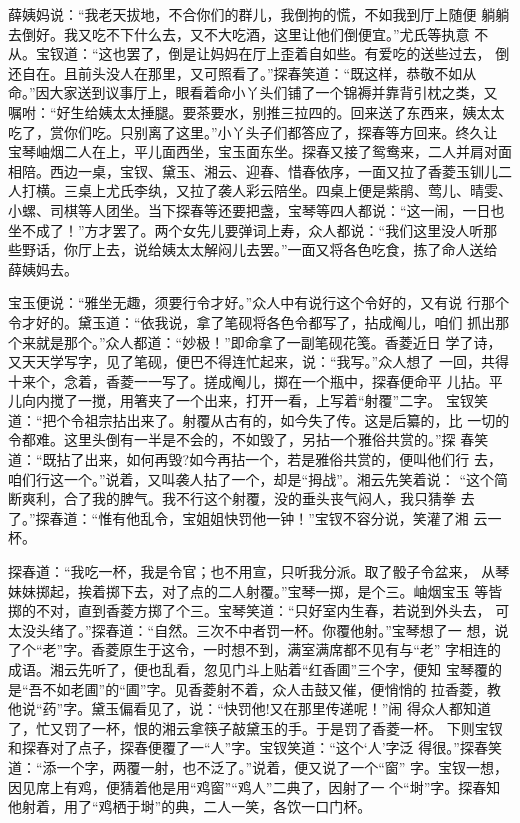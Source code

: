 薛姨妈说：“我老天拔地，不合你们的群儿，我倒拘的慌，不如我到厅上随便
躺躺去倒好。我又吃不下什么去，又不大吃酒，这里让他们倒便宜。”尤氏等执意
不从。宝钗道：“这也罢了，倒是让妈妈在厅上歪着自如些。有爱吃的送些过去，
倒还自在。且前头没人在那里，又可照看了。”探春笑道：“既这样，恭敬不如从
命。”因大家送到议事厅上，眼看着命小丫头们铺了一个锦褥并靠背引枕之类，又
嘱咐：“好生给姨太太捶腿。要茶要水，别推三拉四的。回来送了东西来，姨太太
吃了，赏你们吃。只别离了这里。”小丫头子们都答应了，探春等方回来。终久让
宝琴岫烟二人在上，平儿面西坐，宝玉面东坐。探春又接了鸳鸯来，二人并肩对面
相陪。西边一桌，宝钗、黛玉、湘云、迎春、惜春依序，一面又拉了香菱玉钏儿二
人打横。三桌上尤氏李纨，又拉了袭人彩云陪坐。四桌上便是紫鹃、莺儿、晴雯、
小螺、司棋等人团坐。当下探春等还要把盏，宝琴等四人都说：“这一闹，一日也
坐不成了！”方才罢了。两个女先儿要弹词上寿，众人都说：“我们这里没人听那
些野话，你厅上去，说给姨太太解闷儿去罢。”一面又将各色吃食，拣了命人送给
薛姨妈去。

宝玉便说：“雅坐无趣，须要行令才好。”众人中有说行这个令好的，又有说
行那个令才好的。黛玉道：“依我说，拿了笔砚将各色令都写了，拈成阄儿，咱们
抓出那个来就是那个。”众人都道：“妙极！”即命拿了一副笔砚花笺。香菱近日
学了诗，又天天学写字，见了笔砚，便巴不得连忙起来，说：“我写。”众人想了
一回，共得十来个，念着，香菱一一写了。搓成阄儿，掷在一个瓶中，探春便命平
儿拈。平儿向内搅了一搅，用箸夹了一个出来，打开一看，上写着“射覆”二字。
宝钗笑道：“把个令祖宗拈出来了。射覆从古有的，如今失了传。这是后纂的，比
一切的令都难。这里头倒有一半是不会的，不如毁了，另拈一个雅俗共赏的。”探
春笑道：“既拈了出来，如何再毁?如今再拈一个，若是雅俗共赏的，便叫他们行
去，咱们行这一个。”说着，又叫袭人拈了一个，却是“拇战”。湘云先笑着说：
“这个简断爽利，合了我的脾气。我不行这个射覆，没的垂头丧气闷人，我只猜拳
去了。”探春道：“惟有他乱令，宝姐姐快罚他一钟！”宝钗不容分说，笑灌了湘
云一杯。

探春道：“我吃一杯，我是令官；也不用宣，只听我分派。取了骰子令盆来，
从琴妹妹掷起，挨着掷下去，对了点的二人射覆。”宝琴一掷，是个三。岫烟宝玉
等皆掷的不对，直到香菱方掷了个三。宝琴笑道：“只好室内生春，若说到外头去，
可太没头绪了。”探春道：“自然。三次不中者罚一杯。你覆他射。”宝琴想了一
想，说了个“老”字。香菱原生于这令，一时想不到，满室满席都不见有与“老”
字相连的成语。湘云先听了，便也乱看，忽见门斗上贴着“红香圃”三个字，便知
宝琴覆的是“吾不如老圃”的“圃”字。见香菱射不着，众人击鼓又催，便悄悄的
拉香菱，教他说“药”字。黛玉偏看见了，说：“快罚他!又在那里传递呢！”闹
得众人都知道了，忙又罚了一杯，恨的湘云拿筷子敲黛玉的手。于是罚了香菱一杯。
下则宝钗和探春对了点子，探春便覆了一“人”字。宝钗笑道：“这个‘人’字泛
得很。”探春笑道：“添一个字，两覆一射，也不泛了。”说着，便又说了一个“窗”
字。宝钗一想，因见席上有鸡，便猜着他是用“鸡窗”“鸡人”二典了，因射了一
个“埘”字。探春知他射着，用了“鸡栖于埘”的典，二人一笑，各饮一口门杯。

